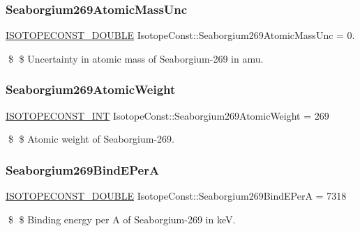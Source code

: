 \subsubsection{\texorpdfstring{Seaborgium269\+Atomic\+Mass\+Unc}{Seaborgium269AtomicMassUnc}}
{\footnotesize\ttfamily \mbox{\hyperlink{group___isotope_const-_macros_ga8f45a7272ce02c0b4c65c44636ed719a}{I\+S\+O\+T\+O\+P\+E\+C\+O\+N\+S\+T\+\_\+\+D\+O\+U\+B\+LE}} Isotope\+Const\+::\+Seaborgium269\+Atomic\+Mass\+Unc = 0.}

\$ \$ Uncertainty in atomic mass of Seaborgium-\/269 in amu. \mbox{\label{group___isotope_const-_seaborgium-_sg269_ga83d6a1fb11bd8acb9d2ebdb85fd90f11}} 
\subsubsection{\texorpdfstring{Seaborgium269\+Atomic\+Weight}{Seaborgium269AtomicWeight}}
{\footnotesize\ttfamily \mbox{\hyperlink{group___isotope_const-_macros_ga5f18360b3e99483a35c32d789e62621c}{I\+S\+O\+T\+O\+P\+E\+C\+O\+N\+S\+T\+\_\+\+I\+NT}} Isotope\+Const\+::\+Seaborgium269\+Atomic\+Weight = 269}

\$ \$ Atomic weight of Seaborgium-\/269. \mbox{\label{group___isotope_const-_seaborgium-_sg269_gae51a6fcfdfe0731625a609de5d4079cb}} 
\subsubsection{\texorpdfstring{Seaborgium269\+Bind\+E\+PerA}{Seaborgium269BindEPerA}}
{\footnotesize\ttfamily \mbox{\hyperlink{group___isotope_const-_macros_ga8f45a7272ce02c0b4c65c44636ed719a}{I\+S\+O\+T\+O\+P\+E\+C\+O\+N\+S\+T\+\_\+\+D\+O\+U\+B\+LE}} Isotope\+Const\+::\+Seaborgium269\+Bind\+E\+PerA = 7318}

\$ \$ Binding energy per A of Seaborgium-\/269 in keV. \mbox{\label{group___isotope_const-_seaborgium-_sg269_gac164849881b093c3158e2bb16a8b9a11}} 
